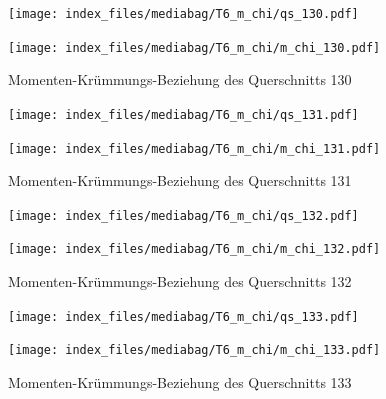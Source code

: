 \documentclass[
  11pt,
  letterpaper,
]{scrreprt}
\begin{document}
\begin{figure}[H]

\begin{minipage}{0.50\linewidth}
\texttt{[image: index\_files/mediabag/T6\_m\_chi/qs\_130.pdf]}\end{minipage}%
%
\begin{minipage}{0.50\linewidth}
\texttt{[image: index\_files/mediabag/T6\_m\_chi/m\_chi\_130.pdf]}\end{minipage}%

\caption{\label{fig-mchi_anhang}Momenten-Krümmungs-Beziehung des
Querschnitts 130}

\end{figure}%

\begin{figure}[H]

\begin{minipage}{0.50\linewidth}
\texttt{[image: index\_files/mediabag/T6\_m\_chi/qs\_131.pdf]}\end{minipage}%
%
\begin{minipage}{0.50\linewidth}
\texttt{[image: index\_files/mediabag/T6\_m\_chi/m\_chi\_131.pdf]}\end{minipage}%

\caption{\label{fig-mchi_anhang}Momenten-Krümmungs-Beziehung des
Querschnitts 131}

\end{figure}%

\begin{figure}[H]

\begin{minipage}{0.50\linewidth}
\texttt{[image: index\_files/mediabag/T6\_m\_chi/qs\_132.pdf]}\end{minipage}%
%
\begin{minipage}{0.50\linewidth}
\texttt{[image: index\_files/mediabag/T6\_m\_chi/m\_chi\_132.pdf]}\end{minipage}%

\caption{\label{fig-mchi_anhang}Momenten-Krümmungs-Beziehung des
Querschnitts 132}

\end{figure}%

\begin{figure}[H]

\begin{minipage}{0.50\linewidth}
\texttt{[image: index\_files/mediabag/T6\_m\_chi/qs\_133.pdf]}\end{minipage}%
%
\begin{minipage}{0.50\linewidth}
\texttt{[image: index\_files/mediabag/T6\_m\_chi/m\_chi\_133.pdf]}\end{minipage}%

\caption{\label{fig-mchi_anhang}Momenten-Krümmungs-Beziehung des
Querschnitts 133}

\end{figure}%
\end{document}
